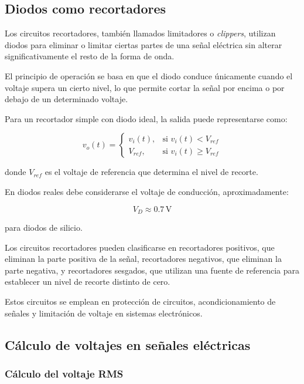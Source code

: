 \documentclass[journal]{IEEEtran}
\begin{document}
\subsection{Diodos como recortadores}

Los circuitos recortadores, también llamados limitadores o \textit{clippers}, utilizan diodos para eliminar o limitar ciertas partes de una señal eléctrica sin alterar significativamente el resto de la forma de onda.

El principio de operación se basa en que el diodo conduce únicamente cuando el voltaje supera un cierto nivel, lo que permite cortar la señal por encima o por debajo de un determinado voltaje.

Para un recortador simple con diodo ideal, la salida puede representarse como:

\begin{equation}
v_o(t)=
\begin{cases}
v_i(t), & \text{si } v_i(t) < V_{ref} \\
V_{ref}, & \text{si } v_i(t) \ge V_{ref}
\end{cases}
\end{equation}

donde $V_{ref}$ es el voltaje de referencia que determina el nivel de recorte.

En diodos reales debe considerarse el voltaje de conducción, aproximadamente:

\begin{equation}
V_D \approx 0.7 \, \text{V}
\end{equation}

para diodos de silicio.

Los circuitos recortadores pueden clasificarse en recortadores positivos, que eliminan la parte positiva de la señal, recortadores negativos, que eliminan la parte negativa, y recortadores sesgados, que utilizan una fuente de referencia para establecer un nivel de recorte distinto de cero.

Estos circuitos se emplean en protección de circuitos, acondicionamiento de señales y limitación de voltaje en sistemas electrónicos.
\subsection{Cálculo de voltajes en señales eléctricas}

\subsubsection{Cálculo del voltaje RMS}
\end{document}
